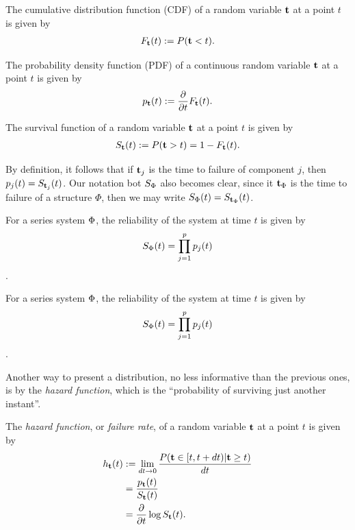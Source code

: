 \begin{definition}[CDF]
The cumulative distribution function (CDF) of a random variable $\mathbf{t}$ at a point $t$  is given by
\begin{align}
	F_{\mathbf{t}} (t):= P(\mathbf{t}<t).
\end{align}
\end{definition}

\begin{definition}[PDF]
The probability density function (PDF) of a continuous random variable $\mathbf{t}$ at a point $t$ is given by 
\begin{align}
	p_{\mathbf{t}} (t):= \frac{\partial}{\partial t}F_{\mathbf{t}} (t).
\end{align}
\end{definition}


\begin{definition}
The survival function of a random variable $\mathbf{t}$ at a point $t$ is given by 
\begin{align}
	S_{\mathbf{t}} (t):= P(\mathbf{t}>t)=1-F_{\mathbf{t}} (t).
\end{align}
\end{definition}
By definition, it follows that if $\mathbf{t}_j$ is the time to failure of component $j$, then $p_j(t)=S_{\mathbf{t}_j} (t)$.
Our notation bot $S_\Phi$ also becomes clear, since it $\mathbf{t}_\Phi$ is the time to failure of a structure $\Phi$, then we may write $S_\Phi(t)=S_{\mathbf{t}_\Phi} (t)$.


\begin{example}
For a series system $\Phi$, the reliability of the system at time $t$ is given by $$S_{\Phi} (t)=\prod_{j=1}^{p} p_j(t)$$.
\end{example}


\begin{example}
For a series system $\Phi$, the reliability of the system at time $t$ is given by $$S_{\Phi} (t)=\prod_{j=1}^{p} p_j(t)$$.
\end{example}





Another way to present a distribution, no less informative than the previous ones, is by the \emph{hazard function}, which is the ``probability of surviving just another instant''.
\begin{definition}
The \emph{hazard function}, or \emph{failure rate}, of a random variable $\mathbf{t}$ at a point $t$ is given by 
\begin{align}
	h_{\mathbf{t}} (t) &:= \lim_{dt\to 0}\frac{P( \mathbf{t} \in [t,t+dt)|\mathbf{t} \geq t )}{dt} \label{eq:hazard}\\
	&= \frac{p_{\mathbf{t}} (t)}{S_{\mathbf{t}} (t)} \\
	&= \frac{\partial}{\partial t}\log S_{\mathbf{t}} (t).
\end{align}
\end{definition}



